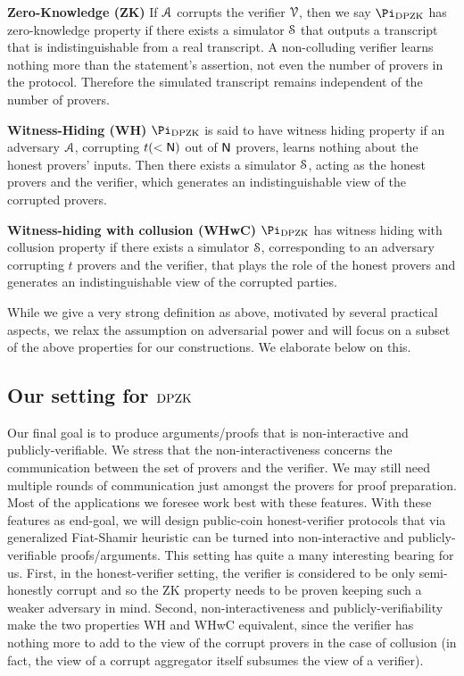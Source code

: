 {\bf Zero-Knowledge (ZK)} If $\mathcal{A}$ corrupts the verifier $\mathcal{V}$, then we say $\Pi_{\DPZK}$ has zero-knowledge property if there exists a simulator $\mathcal{S}$ that outputs a transcript that is indistinguishable from a real transcript. A non-colluding verifier learns nothing more than the statement's assertion, not even the number of provers in the protocol. Therefore the simulated transcript remains independent of the number of provers.  

{\bf Witness-Hiding (WH)} $\Pi_{\DPZK}$ is said to have witness hiding property if an adversary $\mathcal{A}$, corrupting $t( < \mathsf{N})$ out of $\mathsf{N}$ provers, learns nothing about the honest provers' inputs. Then there exists a simulator $\mathcal{S}$, acting as the honest provers and the verifier, which generates an indistinguishable view of the corrupted provers.

{\bf Witness-hiding with collusion (WHwC)} $\Pi_{\DPZK}$ has witness hiding with collusion property if there exists a simulator $\mathcal{S}$, corresponding to an adversary corrupting $t$ provers and the verifier, that plays the role of the honest provers and generates an indistinguishable view of the corrupted parties.

While we give a very strong definition as above, motivated by several practical aspects, we relax the assumption on adversarial power and will focus on a subset of the above properties for our constructions. We elaborate below on this.

\subsection{Our setting for $\text{DPZK}$}\label{subsec:our_setting}
Our final goal is to produce arguments/proofs that is non-interactive and publicly-verifiable.  We stress that the non-interactiveness concerns the communication between the set of provers and the verifier. We may still need multiple rounds of communication just amongst the provers for proof preparation.   Most of the applications we foresee work best  with these features. With these features as end-goal, we  will design public-coin honest-verifier  protocols that via generalized Fiat-Shamir heuristic \cite{FS86, BCS16} can be turned into non-interactive and publicly-verifiable proofs/arguments. This setting has quite a many interesting bearing for us. First,   in the honest-verifier setting, the verifier is considered to be only semi-honestly corrupt and so the ZK property needs to be proven keeping such a weaker adversary in mind. Second,  non-interactiveness and publicly-verifiability make the two properties WH and WHwC equivalent, since the verifier has nothing more to add to the view of the corrupt provers in the case of collusion (in fact, the view of a corrupt aggregator itself subsumes the view of a verifier). 

